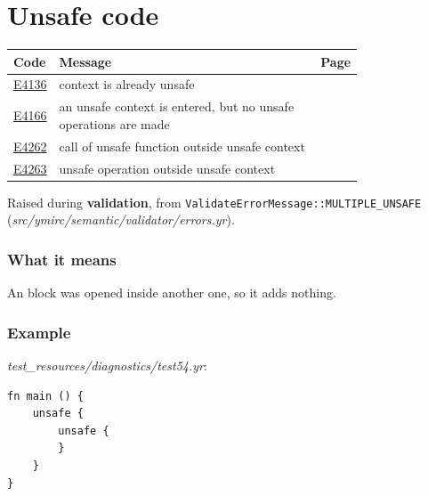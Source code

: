 
\clearpage
\section{Unsafe code}
\label{sec:codes:unsafe}

\begin{longtable}{@{}l p{0.78\linewidth} r@{}}
\toprule Code & Message & Page\\ \midrule \endhead
\hyperref[sec:codes:e4136]{E4136} & context is already unsafe & \pageref{sec:codes:e4136}\\
\hyperref[sec:codes:e4166]{E4166} & an unsafe context is entered, but no unsafe operations are made & \pageref{sec:codes:e4166}\\
\hyperref[sec:codes:e4262]{E4262} & call of unsafe function outside unsafe context & \pageref{sec:codes:e4262}\\
\hyperref[sec:codes:e4263]{E4263} & unsafe operation outside unsafe context & \pageref{sec:codes:e4263}\\
\bottomrule
\end{longtable}

\label{sec:codes:e4136}

Raised during \textbf{validation}, from \texttt{ValidateErrorMessage::\allowbreak{}MULTIPLE\_\allowbreak{}UNSAFE} (\textit{src/\allowbreak{}ymirc/\allowbreak{}semantic/\allowbreak{}validator/\allowbreak{}errors.yr}).

\subsubsection*{What it means}

An  block was opened inside another one, so it adds nothing.

\subsubsection*{Example}

\textit{test\_\allowbreak{}resources/\allowbreak{}diagnostics/\allowbreak{}test54.yr}:

\begin{lstlisting}[style=coloredverbatimError]
fn main () {
    unsafe {
        unsafe {
        }
    }
}
\end{lstlisting}

